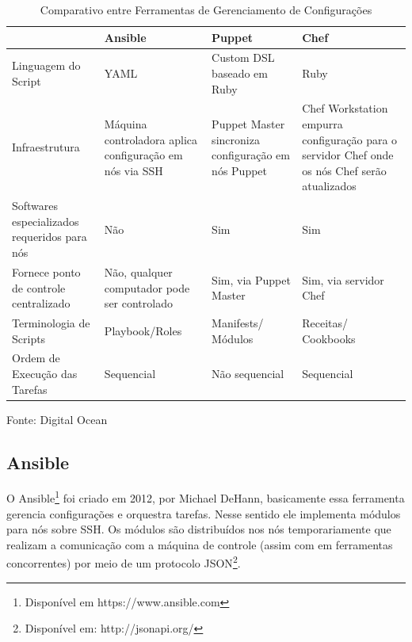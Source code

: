 \begin{table}[h]
	\centering

	\begin{tabular}{|p{3.0cm}|p{3.0cm}|p{3.0cm}|p{3.0cm}|}
		\cline{1-4}
		
		  & Ansible &Puppet & Chef \\ %
		\hline                               %
		Linguagem do Script & YAML        & Custom DSL baseado em Ruby & Ruby\\ \cline{1-4}
		
		Infraestrutura & Máquina controladora aplica configuração em nós via SSH  & Puppet Master sincroniza configuração em nós Puppet & Chef Workstation empurra configuração para o servidor Chef onde os nós Chef serão atualizados  \\ \cline{1-4}
		
		Softwares especializados requeridos para nós & Não & Sim & Sim\\ \cline{1-4}
		
		Fornece ponto de controle centralizado & Não, qualquer computador pode ser controlado &  Sim, via  Puppet Master & Sim, via servidor Chef \\ \cline{1-4}
		
		Terminologia de Scripts & Playbook/Roles & Manifests/ Módulos & Receitas/ Cookbooks \\ \cline{1-4}
		
		Ordem de Execução das Tarefas & Sequencial & Não sequencial & Sequencial \\ \cline{1-4}         
		
	\end{tabular}
	\caption{Comparativo entre Ferramentas de Gerenciamento de Configurações}
	Fonte: Digital Ocean\footnotemark
\end{table}


\subsection{Ansible}

O Ansible\footnote{Disponível em https://www.ansible.com} foi criado em 2012, por Michael DeHann, basicamente essa ferramenta gerencia configurações e orquestra tarefas. Nesse sentido ele implementa módulos para nós sobre SSH. Os módulos são distribuídos nos nós temporariamente que realizam a comunicação com a máquina de controle (assim com em ferramentas concorrentes) por meio de um protocolo JSON\footnote{Disponível em: http://jsonapi.org/}.\cite{imhofsurvey}

